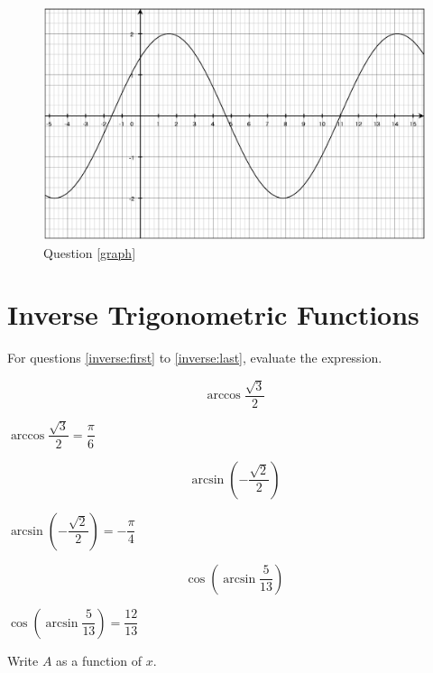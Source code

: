 \documentclass[fleqn,addpoints]{exam}
\begin{document}
\begin{questions}
\begin{parts}
\begin{solution}
\begin{figure}[H]
  \centering
  \includegraphics[scale=.3]{graph_solution.eps}
  \caption*{Question \ref{graph}}
\end{figure}
\end{solution}

\end{parts}

\ifprintanswers
\else
\pagebreak
\fi

\section{Inverse Trigonometric Functions} 

For questions \ref{inverse:first} to \ref{inverse:last}, evaluate the expression.

\question[2]
\label{inverse:first}
\[
  \arccos \frac{\sqrt{3}}{2} 
\]

\begin{solution}[1 cm]
  $\arccos \dfrac{\sqrt{3}}{2} = \dfrac{\pi}{6}$
\end{solution}

\question[3]
\[
  \arcsin \left( - \frac{\sqrt{2}}{2} \right)
\]
\begin{solution}[1 cm]
  $\arcsin \left( - \dfrac{\sqrt{2}}{2} \right) = - \dfrac{\pi}{4}$
\end{solution}

\question[5]
\label{inverse:last}
\[
  \cos \left( \arcsin \frac{5}{13} \right)
\]
\begin{solution}[2 cm]
  $\cos \left( \arcsin \dfrac{5}{13} \right) = \dfrac{12}{13}$
\end{solution}

\question[5]
\label{inverse:triangle}
Write $A$ as a function of $x$.


\end{questions}
\end{document}
